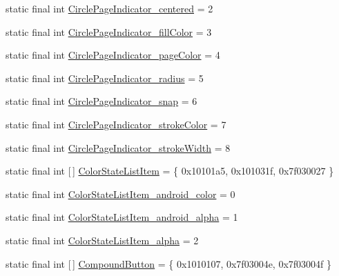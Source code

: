 \begin{DoxyCompactItemize}
\item 
static final int \mbox{\hyperlink{classcom_1_1synnapps_1_1carouselview_1_1_r_1_1styleable_a6a2e4158a0496dacdb4931c1e2f21202}{Circle\+Page\+Indicator\+\_\+centered}} = 2
\item 
static final int \mbox{\hyperlink{classcom_1_1synnapps_1_1carouselview_1_1_r_1_1styleable_ae41558389c1daa16891dcb404f8a6776}{Circle\+Page\+Indicator\+\_\+fill\+Color}} = 3
\item 
static final int \mbox{\hyperlink{classcom_1_1synnapps_1_1carouselview_1_1_r_1_1styleable_a9b6eaf71ff070fb715c33c8c3d7ecee3}{Circle\+Page\+Indicator\+\_\+page\+Color}} = 4
\item 
static final int \mbox{\hyperlink{classcom_1_1synnapps_1_1carouselview_1_1_r_1_1styleable_a8b4772f9bc67f6c9362c4cf273fc0ab1}{Circle\+Page\+Indicator\+\_\+radius}} = 5
\item 
static final int \mbox{\hyperlink{classcom_1_1synnapps_1_1carouselview_1_1_r_1_1styleable_a56cd41bc1a3b0c92ae419d67f7729e5c}{Circle\+Page\+Indicator\+\_\+snap}} = 6
\item 
static final int \mbox{\hyperlink{classcom_1_1synnapps_1_1carouselview_1_1_r_1_1styleable_a41aed2823d314b6a57da7e8b4537b849}{Circle\+Page\+Indicator\+\_\+stroke\+Color}} = 7
\item 
static final int \mbox{\hyperlink{classcom_1_1synnapps_1_1carouselview_1_1_r_1_1styleable_a63778137232be9647fd569b3b3f96874}{Circle\+Page\+Indicator\+\_\+stroke\+Width}} = 8
\item 
static final int \mbox{[}$\,$\mbox{]} \mbox{\hyperlink{classcom_1_1synnapps_1_1carouselview_1_1_r_1_1styleable_a2370ec86374cf52dc396084a2e0f2706}{Color\+State\+List\+Item}} = \{ 0x10101a5, 0x101031f, 0x7f030027 \}
\item 
static final int \mbox{\hyperlink{classcom_1_1synnapps_1_1carouselview_1_1_r_1_1styleable_a805cbad15ab7b7d39736dc82b86f613e}{Color\+State\+List\+Item\+\_\+android\+\_\+color}} = 0
\item 
static final int \mbox{\hyperlink{classcom_1_1synnapps_1_1carouselview_1_1_r_1_1styleable_acd37349e9bcfff5fd5759abc577d8481}{Color\+State\+List\+Item\+\_\+android\+\_\+alpha}} = 1
\item 
static final int \mbox{\hyperlink{classcom_1_1synnapps_1_1carouselview_1_1_r_1_1styleable_aa0bdcada0786814ae92d95e27c76edb1}{Color\+State\+List\+Item\+\_\+alpha}} = 2
\item 
static final int \mbox{[}$\,$\mbox{]} \mbox{\hyperlink{classcom_1_1synnapps_1_1carouselview_1_1_r_1_1styleable_a1e345d320091eb3fb19121766ce750e6}{Compound\+Button}} = \{ 0x1010107, 0x7f03004e, 0x7f03004f \}

\end{DoxyCompactItemize}
